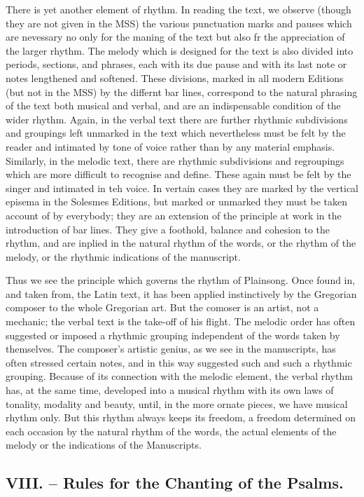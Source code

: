 There is yet another element of rhythm. In reading the text, we observe (though they are not given in the MSS) the various punctuation marks and pauses which are nevessary no only for the maning of the text but also fr the appreciation of the larger rhythm. The melody which is designed for the text is also divided into periods, sections, and phrases, each with its due pause and with its last note or notes lengthened and softened. These divisions, marked in all modern Editions (but not in the MSS) by the differnt bar lines, correspond to the natural phrasing of the text both musical and verbal, and are an indispensable condition of the wider rhythm. Again, in the verbal text there are further rhythmic subdivisions and groupings left unmarked in the text which nevertheless must be felt by the reader and intimated by tone of voice rather than by any material emphasis. Similarly, in the melodic text, there are rhythmic subdivisions and regroupings which are more difficult to recognise and define. These again must be felt by the singer and intimated in teh voice. In vertain cases they are marked by the vertical episema in the Solesmes Editions, but marked or unmarked they must be taken account of by everybody; they are an extension of the principle at work in the introduction of bar lines. They give a foothold, balance and cohesion to the rhythm, and are inplied in the natural rhythm of the words, or the rhythm of the melody, or the rhythmic indications of the manuscript.

Thus we see the principle which governs the rhythm of Plainsong. Once found in, and taken from, the Latin text, it has been applied instinctively by the Gregorian composer to the whole Gregorian art. But the comoser is an artist, not a mechanic; the verbal text is the take-off of his flight. The melodic order has often suggested or imposed a rhythmic grouping independent of the words taken by themselves. The composer's artistic genius, as we see in the manuscripts, has often stressed certain notes, and in this way suggested such and such a rhythmic grouping. Because of its connection with the melodic element, the verbal rhythm has, at the same time, developed into a musical rhythm with its own laws of tonality, modality and beauty, until, in the more ornate pieces, we have musical rhythm only. But this rhythm always keeps its freedom, a freedom determined on each occasion by the natural rhythm of the words, the actual elements of the melody or the indications of the Manuscripts.

\subsection{VIII. -- Rules for the Chanting of the Psalms.}

